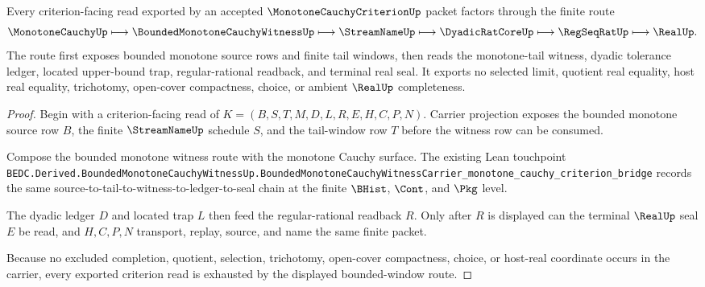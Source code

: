 \begin{theorem}
\label{thm:monotone-cauchy-criterion-bounded-window-route}
Every criterion-facing read exported by an accepted $\MonotoneCauchyCriterionUp$ packet factors through the finite route
$$
\MonotoneCauchyUp \longmapsto \BoundedMonotoneCauchyWitnessUp \longmapsto
\StreamNameUp \longmapsto \DyadicRatCoreUp \longmapsto \RegSeqRatUp \longmapsto \RealUp .
$$
The route first exposes bounded monotone source rows and finite tail windows, then reads the monotone-tail witness, dyadic tolerance ledger, located upper-bound trap, regular-rational readback, and terminal real seal. It exports no selected limit, quotient real equality, host real equality, trichotomy, open-cover compactness, choice, or ambient $\RealUp$ completeness.
\end{theorem}
\begin{proof}
Begin with a criterion-facing read of $K=(B,S,T,M,D,L,R,E,H,C,P,N)$. Carrier projection exposes the bounded monotone source row $B$, the finite $\StreamNameUp$ schedule $S$, and the tail-window row $T$ before the witness row can be consumed.

Compose the bounded monotone witness route with the monotone Cauchy surface. The existing Lean touchpoint \texttt{BEDC.Derived.BoundedMonotoneCauchyWitnessUp.BoundedMonotoneCauchyWitnessCarrier\_monotone\_cauchy\_criterion\_bridge} records the same source-to-tail-to-witness-to-ledger-to-seal chain at the finite $\BHist$, $\Cont$, and $\Pkg$ level.

The dyadic ledger $D$ and located trap $L$ then feed the regular-rational readback $R$. Only after $R$ is displayed can the terminal $\RealUp$ seal $E$ be read, and $H,C,P,N$ transport, replay, source, and name the same finite packet.

Because no excluded completion, quotient, selection, trichotomy, open-cover compactness, choice, or host-real coordinate occurs in the carrier, every exported criterion read is exhausted by the displayed bounded-window route.
\end{proof}


